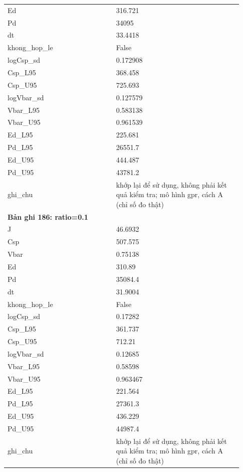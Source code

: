 \begin{longtable}{p{0.43\linewidth}p{0.50\linewidth}}
Ed & 316.721 \\
Pd & 34095 \\
dt & 33.4418 \\
khong\_\allowbreak hop\_\allowbreak le & False \\
logCsp\_\allowbreak sd & 0.172908 \\
Csp\_\allowbreak L95 & 368.458 \\
Csp\_\allowbreak U95 & 725.693 \\
logVbar\_\allowbreak sd & 0.127579 \\
Vbar\_\allowbreak L95 & 0.583138 \\
Vbar\_\allowbreak U95 & 0.961539 \\
Ed\_\allowbreak L95 & 225.681 \\
Pd\_\allowbreak L95 & 26551.7 \\
Ed\_\allowbreak U95 & 444.487 \\
Pd\_\allowbreak U95 & 43781.2 \\
ghi\_\allowbreak chu & khớp lại để sử dụng, không phải kết quả kiểm tra; mô hình gpr, cách A (chỉ số đo thật) \\
\midrule
\multicolumn{2}{p{0.95\linewidth}}{\textbf{Bản ghi 186: ratio=0.1}} \\
J & 46.6932 \\
Csp & 507.575 \\
Vbar & 0.75138 \\
Ed & 310.89 \\
Pd & 35084.4 \\
dt & 31.9004 \\
khong\_\allowbreak hop\_\allowbreak le & False \\
logCsp\_\allowbreak sd & 0.17282 \\
Csp\_\allowbreak L95 & 361.737 \\
Csp\_\allowbreak U95 & 712.21 \\
logVbar\_\allowbreak sd & 0.12685 \\
Vbar\_\allowbreak L95 & 0.58598 \\
Vbar\_\allowbreak U95 & 0.963467 \\
Ed\_\allowbreak L95 & 221.564 \\
Pd\_\allowbreak L95 & 27361.3 \\
Ed\_\allowbreak U95 & 436.229 \\
Pd\_\allowbreak U95 & 44987.4 \\
ghi\_\allowbreak chu & khớp lại để sử dụng, không phải kết quả kiểm tra; mô hình gpr, cách A (chỉ số đo thật) \\
\midrule

\end{longtable}
